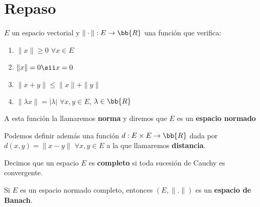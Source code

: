 \chapter*{Repaso}

\begin{definicion}
    $E$ un espacio vectorial y $\|\cdot\|: E \to \bb{R}$ una función que verifica:
    \begin{enumerate}
        \item $\|x\| \geq 0$ $\forall x \in E$
        \item $\|x\| = 0 \sii x=0$
        \item $\|x + y\| \leq \|x\| + \|y\|$
        \item $\|\lambda x\| = |\lambda|$ $\forall x,y\in E$, $\lambda \in \bb{R}$
    \end{enumerate} 

    A esta función la llamaremos \textbf{norma} y diremos que $E$ es un \textbf{espacio normado}

    Podemos definir además una función $d:E\times E \to \bb{R}$ dada por $d(x,y) = \|x-y\|$ $\forall x,y \in E$ a la que llamaremos \textbf{distancia}.

    Decimos que un espacio $E$ es \textbf{completo} si toda sucesión de Cauchy es convergente.

    Si $E$ es un espacio normado completo, entonces $(E, \|.\|)$ es un \textbf{espacio de Banach}.
\end{definicion}

